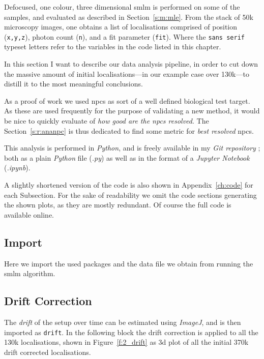 \documentclass[11pt, a4paper, oneside, twocolumn]{report}
\renewcommand{\tt}{\texttt}
\newcommand{\e}{\emph}
\newcommand{\x}[1]{#1\index{#1}}
\begin{document}
Defocused, one colour, three dimensional \gls{smlm} is performed on some
of the samples, and evaluated as described in
Section~\ref{s:m:mle}. From the stack of 50k microscopy images, one
obtains a list of localisations comprised of position (\tt{x,y,z}),
photon count (\tt{n}), and a fit parameter (\tt{fit}). Where the
\tt{sans serif} typeset letters refer to the variables in the code
listed in this chapter.

In this section I want to describe our data analysis pipeline, in
order to cut down the massive amount of initial localisations---in our
example case over 130k---to distill it to the most meaningful
conclusions.

As a proof of work we used \gls{npc}s as sort of a well defined
biological test target. As these are used frequently for the purpose
of validating a new method, it would be nice to quickly evaluate of
\e{how good are the \gls{npc}s resolved}. The Section~\ref{s:r:ananpc}
is thus dedicated to find some metric for \e{best resolved}
\gls{npc}s.

This analysis is performed in \e{\x{Python}}, and is freely available
in my \e{Git repository} \cite{sie21}; both as a plain \e{Python} file
(\e{.py}) as well as in the format of a \e{\x{Jupyter Notebook}}
(\e{.ipynb}).

A slightly shortened version of the code is also shown in
Appendix~\ref{ch:code} for each Subsection. For the sake of
readability we omit the code sections generating the shown plots, as
they are mostly redundant. Of course the full code is available
online.


\subsection{Import}

Here we import the used packages and the data file we obtain from
running the \gls{smlm} algorithm.


\subsection{Drift Correction}

The \e{\x{drift}} of the setup over time can be estimated using
\e{ImageJ}, and is then imported as \tt{drift}. In the following block
the drift correction is applied to all the 130k localisations, shown
in Figure~\ref{f:2_drift} as 3d plot of all the initial 370k drift
corrected localisations.
\end{document}
